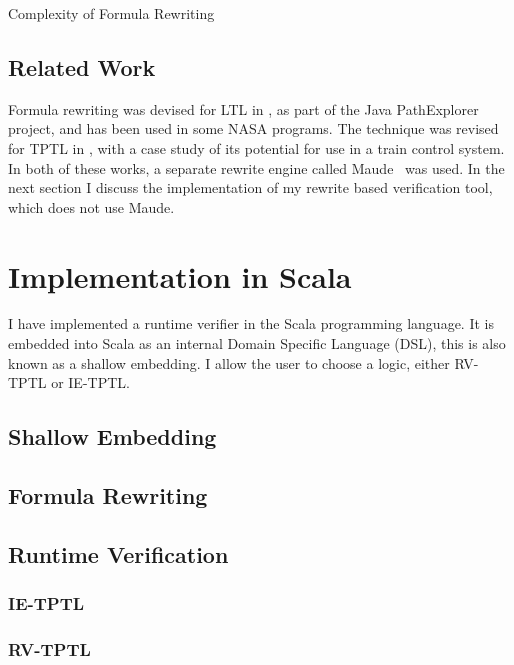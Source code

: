 \documentclass[a4paper]{article}
\begin{document}
\begin{remk}{Complexity of Formula Rewriting}
\end{remk}

\subsection{Related Work}
Formula rewriting was devised for LTL in \textcite{rosu2005rewriting}, as part of the Java PathExplorer project, and has been used in some NASA programs. The technique was revised for TPTL in \textcite{chai2013rewriting}, with a case study of its potential for use in a train control system. In both of these works, a separate rewrite engine called Maude~\autocite{clavel2002maude} was used. In the next section I discuss the implementation of my rewrite based verification tool, which does not use Maude.

\section{Implementation in Scala}\label{implementaion}
I have implemented a runtime verifier in the Scala programming language.
It is embedded into Scala as an internal Domain Specific Language (DSL), this is also known as a shallow embedding.
I allow the user to choose a logic, either RV-TPTL or IE-TPTL.
\subsection{Shallow Embedding}
\subsection{Formula Rewriting}
\subsection{Runtime Verification}

\subsubsection{IE-TPTL}
\subsubsection{RV-TPTL}



\end{document}
